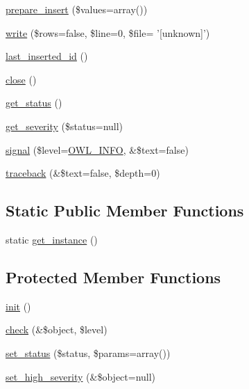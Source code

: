 \begin{DoxyCompactItemize}
\item 
\hyperlink{classDbHandler_a79e3237271c150c4f4f6c2593060567e}{prepare\_\-insert} (\$values=array())
\item 
\hyperlink{classDbHandler_a654166283f0f61f918cc34a5071f838c}{write} (\$rows=false, \$line=0, \$file= '\mbox{[}unknown\mbox{]}')
\item 
\hyperlink{classDbHandler_ad6be57a8dbb86dc1648c79b96128fc97}{last\_\-inserted\_\-id} ()
\item 
\hyperlink{classDbHandler_ad3d2853bbd2d1962710907e34afb424f}{close} ()
\item 
\hyperlink{class__OWL_a99ec771fa2c5c279f80152cc09e489a8}{get\_\-status} ()
\item 
\hyperlink{class__OWL_adf9509ef96858be7bdd9414c5ef129aa}{get\_\-severity} (\$status=null)
\item 
\hyperlink{class__OWL_a51ba4a16409acf2a2f61f286939091a5}{signal} (\$level=\hyperlink{owl_8severitycodes_8php_a139328861128689f2f4def6a399d9057}{OWL\_\-INFO}, \&\$text=false)
\item 
\hyperlink{class__OWL_aa29547995d6741b7d2b90c1d4ea99a13}{traceback} (\&\$text=false, \$depth=0)
\end{DoxyCompactItemize}
\subsection*{Static Public Member Functions}
\begin{DoxyCompactItemize}
\item 
static \hyperlink{classDbHandler_ae9bfc8bdc6a8077adb342702aaffc9af}{get\_\-instance} ()
\end{DoxyCompactItemize}
\subsection*{Protected Member Functions}
\begin{DoxyCompactItemize}
\item 
\hyperlink{class__OWL_ae0ef3ded56e8a6b34b6461e5a721cd3e}{init} ()
\item 
\hyperlink{class__OWL_ad6f4f6946f40199dd0333cf219fa500e}{check} (\&\$object, \$level)
\item 
\hyperlink{class__OWL_aea912d0ede9b3c2a69b79072d94d4787}{set\_\-status} (\$status, \$params=array())
\item 
\hyperlink{class__OWL_a576829692a3b66e3d518853bf43abae3}{set\_\-high\_\-severity} (\&\$object=null)
\end{DoxyCompactItemize}
